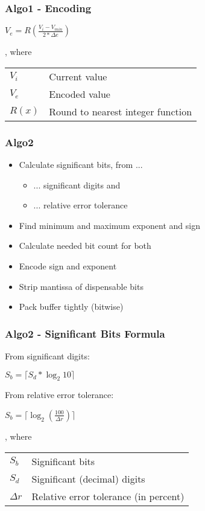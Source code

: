 \documentclass[compress]{beamer}
\begin{document}
\begin{frame}
	\frametitle{Algo1 - Encoding}

	\begin{center}
		$V_e = R\left(\frac{V_i - V_{min}}{2 * \Delta{e}}\right)$
	\end{center}

	\bigskip

	, where\\

	\bigskip

	\begin{tabular}{ll}
		$V_i$ & Current value \\
		$V_e$ & Encoded value \\
		$R\left(x\right)$ & Round to nearest integer function
	\end{tabular}

\end{frame}

\begin{frame}
	\frametitle{Algo2}

	\begin{itemize}
		\item Calculate significant bits, from ...
		\begin{itemize}
			\item ... significant digits and
			\item ... relative error tolerance
		\end{itemize}
		\item Find minimum and maximum exponent and sign
		\item Calculate needed bit count for both
		\item Encode sign and exponent
		\item Strip mantissa of dispensable bits
		\item Pack buffer tightly (bitwise)
	\end{itemize}

\end{frame}

\begin{frame}
	\frametitle{Algo2 - Significant Bits Formula}

	From significant digits:
	\begin{center}
		$S_{b} = \lceil S_d * \log_2{10}\rceil$
	\end{center}

	\bigskip

	From relative error tolerance:
	\begin{center}
		$S_{b} = \lceil \log_2{\left(\frac{100}{\Delta{r}}\right)}\rceil$
	\end{center}

	, where\\

	\bigskip

	\begin{tabular}{ll}
		$S_b$ & Significant bits \\
		$S_d$ & Significant (decimal) digits \\
		$\Delta{r}$ & Relative error tolerance (in percent)
	\end{tabular}

\end{frame}
\end{document}
